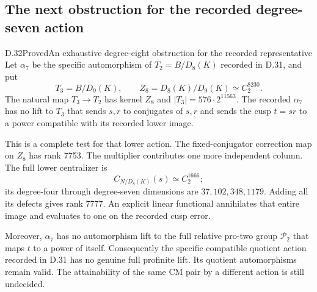 \subsection{The next obstruction for the recorded degree-seven action}

\begin{statement}{D.32}{Proved}{An exhaustive degree-eight obstruction for the recorded representative}
Let $\alpha_7$ be the specific automorphism of
$T_2=B/D_8(K)$ recorded in D.31, and put
\[
 T_3=B/D_9(K),\qquad
 Z_8=D_8(K)/D_9(K)\simeq C_2^{8230}.                 \tag{D.32.1}
\]
The natural map $T_3\to T_2$ has kernel $Z_8$ and
$|T_3|=576\cdot2^{11563}$. The recorded $\alpha_7$
has no lift to $T_3$ that sends $s,r$ to conjugates
of $s,r$ and sends the cusp $t=sr$ to a power
compatible with its recorded lower image.

This is a complete test for that lower action.
The fixed-conjugator correction map on $Z_8$ has
rank 7753. The multiplier contributes one more
independent column. The full lower centralizer is
\[
 C_{N/D_8(K)}(s)\simeq C_2^{1666};                   \tag{D.32.2}
\]
its degree-four through degree-seven dimensions are
$37,102,348,1179$. Adding all its defects gives rank
7777. An explicit linear functional annihilates that
entire image and evaluates to one on the recorded
cusp error.

Moreover, $\alpha_7$ has no automorphism lift to
the full relative pro-two group $\mathcal P_2$
that maps $t$ to a power of itself. Consequently the specific compatible
quotient action recorded in D.31 has no genuine full
profinite lift. Its quotient automorphisms remain
valid. The attainability of the same CM pair by a
different action is still undecided.
\end{statement}
